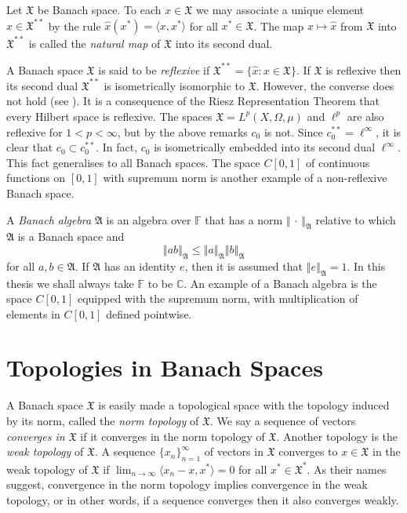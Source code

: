 \documentclass[honours,12pt]{unswthesis}
\newcommand{\C}{\mathbb{C}}
\newcommand{\F}{\mathbb{F}}
\newcommand{\X}{\mathfrak{X}}
\newcommand{\hatt}[1]{\widehat #1}
\def\ip<#1,#2>{\langle #1,#2 \rangle}
\def\lp{\ell^p}
\def\norm#1{\left \Vert #1 \right \Vert}
\numberwithin{equation}{section}
\begin{document}
Let $\X$ be Banach space. To each $x\in\X$ we may associate a unique element
$\hatt{x}\in\X^{**}$ by the rule $\hatt{x}(x^*)=\ip<x,x^*>$ for all $x^*\in\X$.
The map $x\mapsto\hatt{x}$ from $\X$ into $\X^{**}$ is called the {\em natural
map} of $\X$ into its second dual.

A Banach space $\X$ is said to be {\em reflexive} if
$\X^{**}=\{\hatt{x}:x\in\X\}$. If $\X$ is reflexive then its second dual
$\X^{**}$ is isometrically isomorphic to $\X$. However, the converse does not
hold (see \cite[III.11]{Con}). It is a consequence of the Riesz Representation
Theorem \cite[I.3.4]{Con} that every Hilbert space is reflexive.
The spaces $\X=L^p(X,\Omega,\mu)$ and
$\lp$ are also reflexive for $1<p<\infty$, but by the above remarks $c_0$ is 
not. Since
$c_0^{**}=\ell^{\infty}$, it is clear that $c_0\subset c_0^{**}$. In fact,
$c_0$ is isometrically embedded into its second dual $\ell^{\infty}$. This fact
generalises to
all Banach spaces. The space $C[0,1]$ of continuous functions on $[0,1]$ with
supremum norm is another example of a non-reflexive Banach space.

A {\em Banach algebra} $\mathfrak{A}$ is an algebra over $\F$ that has a norm
$\norm{\,\cdot\,}_{\mathfrak{A}}$ relative to which $\mathfrak{A}$ is a Banach
space and
\[\norm{ab}_{\mathfrak{A}}\leq\norm{a}_{\mathfrak{A}}\norm{b}_{\mathfrak{A}}\]
for all $a,b\in\mathfrak{A}$. If $\mathfrak{A}$ has an identity $e$, then it is
assumed that $\norm{e}_{\mathfrak{A}}=1$. In this thesis we shall always take
$\F$ to be $\C$. An example of a Banach algebra is the space $C[0,1]$ equipped
with the supremum norm, with multiplication of elements in $C[0,1]$ defined
pointwise.


\section{Topologies in Banach Spaces}\label{topologies}

A Banach space $\X$ is easily made a topological space with the topology induced
by its norm, called the {\em norm topology} of $\X$. We say a sequence of
vectors {\em converges in $\X$} if it converges in the norm topology of $\X$.
Another
topology is the {\em weak topology} of $\X$. A sequence $\{x_n\}_{n=1}^{\infty}$
of vectors in $\X$ converges to $x\in\X$ in the weak topology of $\X$ if
$\lim_{n\rightarrow\infty}\ip<x_n-x,x^*>=0$ for all $x^*\in\X^*$. As their names
suggest, convergence in the norm topology implies convergence in the weak
topology, or in other words, if a sequence converges then it also converges
weakly.
\end{document}
